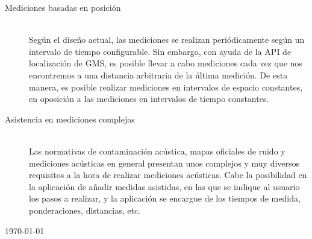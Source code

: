 \begin{description}
    \item[Mediciones basadas en posición]\hfill \\	
    Según el diseño actual, las mediciones se realizan periódicamente según un intervalo de tiempo configurable. Sin embargo, con ayuda de la \ac{API} de localización de \ac{GMS}, es posible llevar a cabo mediciones cada vez que nos encontremos a una distancia arbitraria de la última medición. De esta manera, es posible realizar mediciones en intervalos de espacio constantes, en oposición a las mediciones en intervalos de tiempo constantes.
    
    \item[Asistencia en mediciones complejas]\hfill\\
    Las normativas de contaminación acústica, mapas oficiales de ruido y mediciones acústicas en general presentan unos complejos y muy diversos requisitos a la hora de realizar mediciones acústicas. Cabe la posibilidad en la aplicación de añadir medidas asistidas, en las que se indique al usuario los pasos a realizar, y la aplicación se encargue de los tiempos de medida, ponderaciones, distancias, etc.
	
\end{description}

\begin{flushright}
{\large \pfcauthorname}\nli
\today
\end{flushright}
	
\chapterend{}